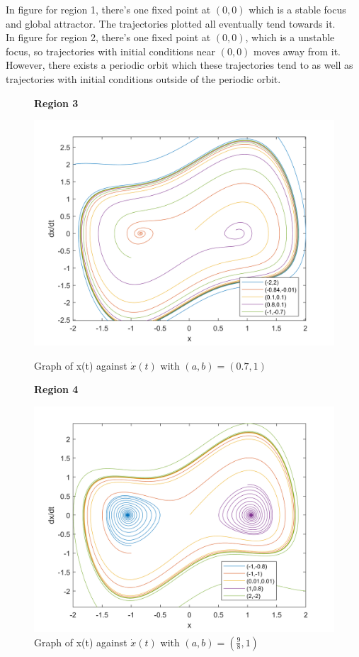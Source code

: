 \documentclass[10pt]{article}
\begin{document}
\noindent In figure for region 1, there's one fixed point at $(0,0)$ which is a stable focus and global attractor. The trajectories plotted all eventually tend towards it.\\
In figure for region 2, there's one fixed point at $(0,0)$, which is a unstable focus, so trajectories with initial conditions near $(0,0)$ moves away from it. However, there exists a periodic orbit which these trajectories tend to as well as trajectories with initial conditions outside of the periodic orbit.
\begin{figure}[H]
    \begin{minipage}[b]{0.5\linewidth}
            \centering
            \textbf{Region 3}\par
            \includegraphics[width=\textwidth]{Files/q6,region3.png}
            \caption{Graph of x(t) against $\dot{x}(t)$ with $(a,b)=(0.7,1)$}
        \end{minipage}
        \hfill
        \begin{minipage}[b]{0.5\linewidth}
            \centering
            \textbf{Region 4}\par
            \includegraphics[width=\textwidth]{Files/q6,region4.png}
            \caption{Graph of x(t) against $\dot{x}(t)$ with $(a,b)=(\frac{9}{8},1)$}
        \end{minipage}
\end{figure}
\end{document}
